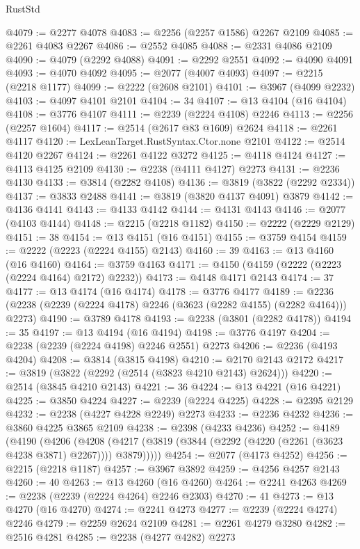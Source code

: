 \begin{lexlean}{RustStd}
\begin{coremodule}
@4079 := @2277 @4078
@4083 := @2256 (@2257 @1586) @2267 @2109
@4085 := @2261 @4083 @2267
@4086 := @2552 @4085
@4088 := @2331 @4086 @2109
@4090 := @4079 (@2292 @4088)
@4091 := @2292 @2551
@4092 := @4090 @4091
@4093 := @4070 @4092
@4095 := @2077 (@4007 @4093)
@4097 := @2215 (@2218 @1177)
@4099 := @2222 (@2608 @2101)
@4101 := @3967 (@4099 @2232)
@4103 := @4097 @4101 @2101
@4104 := 34
@4107 := @13 @4104 (@16 @4104)
@4108 := @3776 @4107
@4111 := @2239 (@2224 @4108) @2246
@4113 := @2256 (@2257 @1604)
@4117 := @2514 (@2617 @83 @1609) @2624
@4118 := @2261 @4117
@4120 := LexLeanTarget.RustSyntax.Ctor.none @2101
@4122 := @2514 @4120 @2267
@4124 := @2261 @4122 @3272
@4125 := @4118 @4124
@4127 := @4113 @4125 @2109
@4130 := @2238 (@4111 @4127) @2273
@4131 := @2236 @4130
@4133 := @3814 (@2282 @4108)
@4136 := @3819 (@3822 (@2292 @2334))
@4137 := @3833 @2488
@4141 := @3819 (@3820 @4137 @4091) @3879
@4142 := @4136 @4141
@4143 := @4133 @4142
@4144 := @4131 @4143
@4146 := @2077 (@4103 @4144)
@4148 := @2215 (@2218 @1182)
@4150 := @2222 (@2229 @2129)
@4151 := 38
@4154 := @13 @4151 (@16 @4151)
@4155 := @3759 @4154
@4159 := @2222 (@2223 (@2224 @4155) @2143)
@4160 := 39
@4163 := @13 @4160 (@16 @4160)
@4164 := @3759 @4163
@4171 := @4150 (@4159 (@2222 (@2223 (@2224 @4164) @2172) @2232))
@4173 := @4148 @4171 @2143
@4174 := 37
@4177 := @13 @4174 (@16 @4174)
@4178 := @3776 @4177
@4189 := @2236 (@2238 (@2239 (@2224 @4178) @2246 (@3623 (@2282 @4155) (@2282 @4164))) @2273)
@4190 := @3789 @4178
@4193 := @2238 (@3801 (@2282 @4178))
@4194 := 35
@4197 := @13 @4194 (@16 @4194)
@4198 := @3776 @4197
@4204 := @2238 (@2239 (@2224 @4198) @2246 @2551) @2273
@4206 := @2236 (@4193 @4204)
@4208 := @3814 (@3815 @4198)
@4210 := @2170 @2143 @2172
@4217 := @3819 (@3822 (@2292 (@2514 (@3823 @4210 @2143) @2624)))
@4220 := @2514 (@3845 @4210 @2143)
@4221 := 36
@4224 := @13 @4221 (@16 @4221)
@4225 := @3850 @4224
@4227 := @2239 (@2224 @4225)
@4228 := @2395 @2129
@4232 := @2238 (@4227 @4228 @2249) @2273
@4233 := @2236 @4232
@4236 := @3860 @4225 @3865 @2109
@4238 := @2398 (@4233 @4236)
@4252 := @4189
    (@4190
      (@4206
        (@4208 (@4217 (@3819 (@3844 (@2292 (@4220 (@2261 (@3623 @4238 @3871) @2267)))) @3879)))))
@4254 := @2077 (@4173 @4252)
@4256 := @2215 (@2218 @1187)
@4257 := @3967 @3892
@4259 := @4256 @4257 @2143
@4260 := 40
@4263 := @13 @4260 (@16 @4260)
@4264 := @2241 @4263
@4269 := @2238 (@2239 (@2224 @4264) @2246 @2303)
@4270 := 41
@4273 := @13 @4270 (@16 @4270)
@4274 := @2241 @4273
@4277 := @2239 (@2224 @4274) @2246
@4279 := @2259 @2624 @2109
@4281 := @2261 @4279 @3280
@4282 := @2516 @4281
@4285 := @2238 (@4277 @4282) @2273

\end{coremodule}
\end{lexlean}
